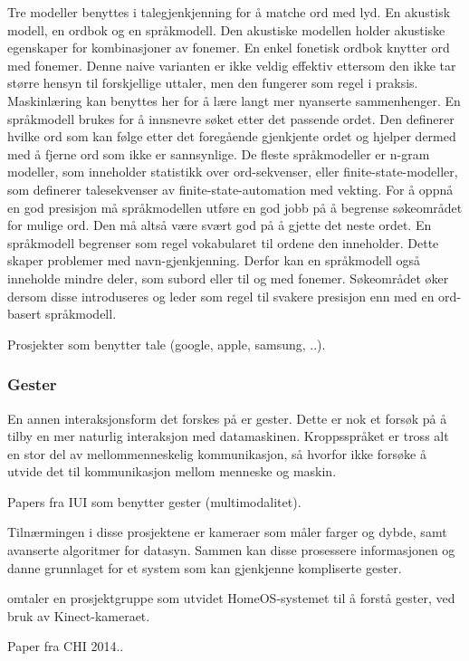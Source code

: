 {{Tre modeller benyttes i talegjenkjenning for å matche ord med lyd. En akustisk modell, en ordbok og en språkmodell. Den akustiske modellen holder akustiske egenskaper for kombinasjoner av fonemer. En enkel fonetisk ordbok knytter ord med fonemer. Denne naive varianten er ikke veldig effektiv ettersom den ikke tar større hensyn til forskjellige uttaler, men den fungerer som regel i praksis. Maskinlæring kan benyttes her for å lære langt mer nyanserte sammenhenger. En språkmodell brukes for å innsnevre søket etter det passende ordet. Den definerer hvilke ord som kan følge etter det foregående gjenkjente ordet og hjelper dermed med å fjerne ord som ikke er sannsynlige. De fleste språkmodeller er n-gram modeller, som inneholder statistikk over ord-sekvenser, eller finite-state-modeller, som definerer talesekvenser av finite-state-automation med vekting. For å oppnå en god presisjon må språkmodellen utføre en god jobb på å begrense søkeområdet for mulige ord. Den må altså være svært god på å gjette det neste ordet. En språkmodell begrenser som regel vokabularet til ordene den inneholder. Dette skaper problemer med navn-gjenkjenning. Derfor kan en språkmodell også inneholde mindre deler, som subord eller til og med fonemer. Søkeområdet øker dersom disse introduseres og leder som regel til svakere presisjon enn med en ord-basert språkmodell.  

Prosjekter som benytter tale (google, apple, samsung, ..).
}

\subsubsection*{Gester}
{\color{blue}
En annen interaksjonsform det forskes på er gester. Dette er nok et forsøk på å tilby en mer naturlig interaksjon med datamaskinen. Kroppsspråket er tross alt en stor del av mellommenneskelig kommunikasjon, så hvorfor ikke forsøke å utvide det til kommunikasjon mellom menneske og maskin.

Papers fra IUI som benytter gester (multimodalitet).

Tilnærmingen i disse prosjektene er kameraer som måler farger og dybde, samt avanserte algoritmer for datasyn. Sammen kan disse prosessere informasjonen og danne grunnlaget for et system som kan gjenkjenne kompliserte gester.

\citet{homeos} omtaler en prosjektgruppe som utvidet HomeOS-systemet til å forstå gester, ved bruk av Kinect-kameraet.

Paper fra CHI 2014..
}

}

